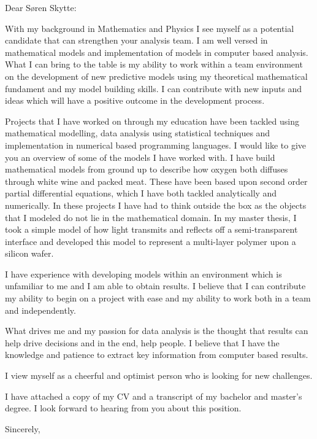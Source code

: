 \documentclass[10pt,a4paper]{letter}
\begin{document}
\begin{letter}{}
\opening{Dear Søren Skytte:}

With my background in Mathematics and Physics I see myself as a potential candidate that can strengthen your analysis team. I am well versed in mathematical models and implementation of models in computer based analysis. What I can bring to the table is my ability to work within a team environment on the development of new predictive models using my theoretical mathematical fundament and my model building skills. I can contribute with new inputs and ideas which will have a positive outcome in the development process.

Projects that I have worked on through my education have been tackled using mathematical modelling, data analysis using statistical techniques and implementation in numerical based programming languages. I would like to give you an overview of some of the models I have worked with. I have build mathematical models from ground up to describe how oxygen both diffuses through white wine and packed meat. These have been based upon second order partial differential equations, which I have both tackled analytically and numerically. In these projects I have had to think outside the box as the objects that I modeled do not lie in the mathematical domain. In my master thesis, I took a simple model of how light transmits and reflects off a semi-transparent interface and developed this model to represent a multi-layer polymer upon a silicon wafer. 

I have experience with developing models within an environment which is unfamiliar to me and I am able to obtain results. I believe that I can contribute my ability to begin on a project with ease and my ability to work both in a team and independently. 

What drives me and my passion for data analysis is the thought that results can help drive decisions and in the end, help people. I believe that I have the knowledge and patience to extract key information from computer based results.      

I view myself as a cheerful and optimist person who is looking for new challenges.

I have attached a copy of my CV and a transcript of my bachelor and master's degree. I look forward to hearing from you about this position.   

\closing{Sincerely,}

\end{letter}

\end{document}
